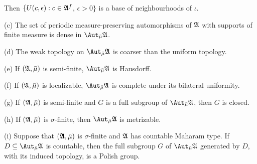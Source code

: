 \noindent Then $\{U(c,\epsilon):c\in\frak A^f$, $\epsilon>0\}$ is a base of
neighbourhoods of $\iota$.

(c) The set of
periodic measure-preserving automorphisms of $\frak A$ with supports of
finite measure is dense in $\AmuA$.

(d) The weak topology on $\AmuA$ is coarser than the uniform
topology.

(e) If $(\frak A,\bar\mu)$ is semi-finite, $\AmuA$ is Hausdorff.

(f) If $(\frak A,\bar\mu)$ is localizable,
$\AmuA$ is complete under its bilateral uniformity.

(g) If $(\frak A,\bar\mu)$ is semi-finite and
$G$ is a full subgroup of $\AmuA$,
then $G$ is closed.

(h) If $(\frak A,\bar\mu)$ is $\sigma$-finite, then $\AmuA$ is
metrizable.

(i) Suppose that $(\frak A,\bar\mu)$ is $\sigma$-finite and $\frak A$ has
countable Maharam type.   If $D\subseteq\AmuA$ is countable, then the full
subgroup $G$ of $\AmuA$ generated by $D$, with its induced topology,
is a Polish group.

